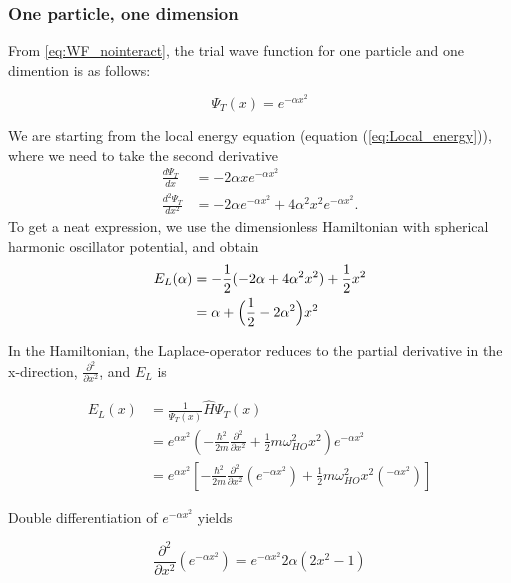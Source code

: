 \documentclass[norsk,a4paper,12pt]{article}
\begin{document}
\subsubsection{One particle, one dimension}

From \ref{eq:WF_nointeract}, the trial wave function for one particle and one dimention is as follows:

\begin{equation}
	\label{eq:WF_1dim_1N}
	\Psi_T(x) = e^{-\alpha x^2} 
\end{equation}

We are starting from the local energy equation (equation (\ref{eq:Local_energy})), where we need to take the second derivative
\begin{align}
\frac{d\Psi_T}{dx}&=-2\alpha xe^{-\alpha x^2}\\
\frac{d^2\Psi_T}{dx^2}&=-2\alpha e^{-\alpha x^2}+4\alpha^2x^2e^{-\alpha x^2}.
\end{align}
To get a neat expression, we use the dimensionless Hamiltonian with spherical harmonic oscillator potential, and obtain
\begin{align}
E_L(\alpha)&=-\frac{1}{2}(-2\alpha + 4\alpha^2x^2)+\frac{1}{2}x^2\notag\\
&=\alpha+\Big(\frac{1}{2}-2\alpha^2\Big)x^2
\end{align}

\iffalse
In the Hamiltonian, the Laplace-operator reduces to the partial derivative in the x-direction, $\frac{\partial^2 }{\partial x^2}$, and $E_L$ is 

\begin{equation}
\begin{aligned}
E_L(x) &=  \frac{1}{\Psi_T(x)}\hat{H}\Psi_T(x) \\ 
			 & =  e^{\alpha x^2} (-\frac{\hbar^2}{2m}\frac{\partial^2 }{\partial x^2} + \frac{1}{2} m \omega_{HO}^2 x^2) e^{-\alpha x^2}  \\
			 & = e^{\alpha x^2} [-\frac{\hbar^2}{2m}\frac{\partial^2 }{\partial x^2} (e^{-\alpha x^2}) + \frac{1}{2} m \omega_{HO}^2 x^2 (^{-\alpha x^2})]
\end{aligned}
\end{equation}

Double differentiation of $ e^{-\alpha x^2}$ yields

\begin{equation}
\frac{\partial^2}{\partial x^2} (e^{-\alpha x^2}) = e^{-\alpha x^2} 2 \alpha (2x^2 -1)
\end{equation}
\end{document}

